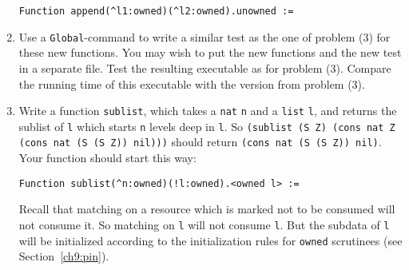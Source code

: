 \documentclass{book}[12pt]
\begin{document}
\begin{enumerate}
\begin{verbatim}
Function append(^l1:owned)(^l2:owned).unowned :=
\end{verbatim}

\item Use a \texttt{Global}-command to write a similar test as the one
of problem (3) for these new functions.  You may wish to put the new
functions and the new test in a separate file.  Test the resulting
executable as for problem (3).  Compare the running time of this
executable with the version from problem (3).

\item Write a function \texttt{sublist}, which takes a \texttt{nat}
\texttt{n} and a \texttt{list} \texttt{l}, and returns the sublist of
\texttt{l} which starts \texttt{n} levels deep in \texttt{l}.  So
\texttt{(sublist (S Z) (cons nat Z (cons nat (S (S Z)) nil)))} should
return \texttt{(cons nat (S (S Z)) nil)}.  Your function should start
this way:

\begin{verbatim}
Function sublist(^n:owned)(!l:owned).<owned l> :=
\end{verbatim}

\noindent Recall that matching on a resource which is marked not to be
consumed will not consume it.  So matching on \texttt{l} will not
consume \texttt{l}.  But the subdata of \texttt{l} will be initialized
according to the initialization rules for \texttt{owned} scrutinees
(see Section~\ref{ch9:pin}).


\end{enumerate}

 
\end{document}
